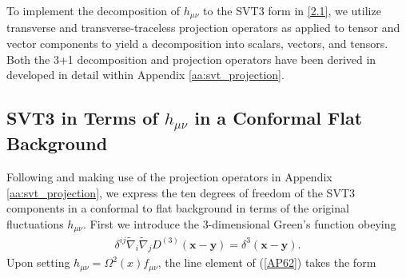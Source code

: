 To implement the decomposition of $h_{\mu\nu}$ to the SVT3 form in \eqref{2.1}, we utilize transverse and transverse-traceless projection operators as applied to tensor and vector components to yield a decomposition into scalars, vectors, and tensors. Both the 3+1 decomposition and projection operators have been derived in developed in detail within Appendix \ref{aa:svt_projection}.
%
\subsection{SVT3 in Terms of $h_{\mu\nu}$ in a Conformal Flat Background}

Following \cite{amarasinghe_2019, phelps_2019} and making use of the projection operators in Appendix \ref{aa:svt_projection}, we express the ten degrees of freedom of the SVT3 components in a conformal to flat background in terms of the original fluctuations $h_{\mu\nu}$. First we introduce the 3-dimensional Green's function obeying
%
\begin{eqnarray}
\delta^{ij}\tilde{\nabla}_i\tilde{\nabla}_jD^{(3)}(\mathbf{x}-\mathbf{y})=\delta^3(\mathbf{x}-\mathbf{y}).
\label{AP64}
\end{eqnarray}
%
Upon setting $h_{\mu\nu}=\Omega^2(x)f_{\mu\nu}$, the line element of (\ref{AP62}) takes the form 
%
